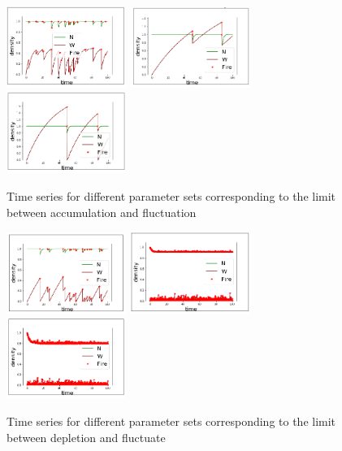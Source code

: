 \documentclass{article}
\begin{document}
\begin{figure}[h!]
\centering
\includegraphics[width=3.9cm]{lim_eq_middle_1.png}
\includegraphics[width=3.9cm]{lim_eq_middle_2.png}
\includegraphics[width=3.9cm]{lim_eq_middle_3.png}
\caption{Time series for different parameter sets corresponding to the limit between accumulation and fluctuation}
\end{figure}


\begin{figure}[h!]
\centering
\includegraphics[width=3.9cm]{lim_c_middle_1.png}
\includegraphics[width=3.9cm]{lim_c_middle_2.png}
\includegraphics[width=3.9cm]{lim_c_middle_3.png}
\caption{Time series for different parameter sets corresponding to the limit between depletion and fluctuate}
\end{figure}
\end{document}
